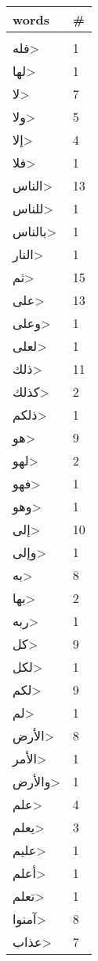 \documentclass{article}
\begin{document}
\begin{multicols}{6}
\begin{center}
\begin{tabular}{ P{2cm}  P{1cm}}
\end{tabular} 
\begin{tabular}{ P{2cm}  P{1cm}} 
\textbf{words}    & \textbf{\#}  \\
\hline
\\[0.01cm]
\<فله> & 1 \\ 
\<لها> & 1 \\ 
\<لا> & 7 \\ 
\<ولا> & 5 \\ 
\<إلا> & 4 \\ 
\<فلا> & 1 \\ 
\<الناس> & 13 \\ 
\<للناس> & 1 \\ 
\<بالناس> & 1 \\ 
\<النار> & 1 \\ 
\<ثم> & 15 \\ 
\<على> & 13 \\ 
\<وعلى> & 1 \\ 
\<لعلى> & 1 \\ 
\<ذلك> & 11 \\ 
\<كذلك> & 2 \\ 
\<ذلكم> & 1 \\ 
\<هو> & 9 \\ 
\<لهو> & 2 \\ 
\<فهو> & 1 \\ 
\<وهو> & 1 \\ 
\<إلى> & 10 \\ 
\<وإلى> & 1 \\ 
\<به> & 8 \\ 
\<بها> & 2 \\ 
\<ربه> & 1 \\ 
\<كل> & 9 \\ 
\<لكل> & 1 \\ 
\<لكم> & 9 \\ 
\<لم> & 1 \\ 
\<الأرض> & 8 \\ 
\<الأمر> & 1 \\ 
\<والأرض> & 1 \\ 
\<علم> & 4 \\ 
\<يعلم> & 3 \\ 
\<عليم> & 1 \\ 
\<أعلم> & 1 \\ 
\<تعلم> & 1 \\ 
\<آمنوا> & 8 \\ 
\<عذاب> & 7 \\ 
\end{tabular} 
\begin{tabular}{ P{2cm}  P{1cm}} 

\end{tabular}
\end{center}
\end{multicols}
\end{document}
